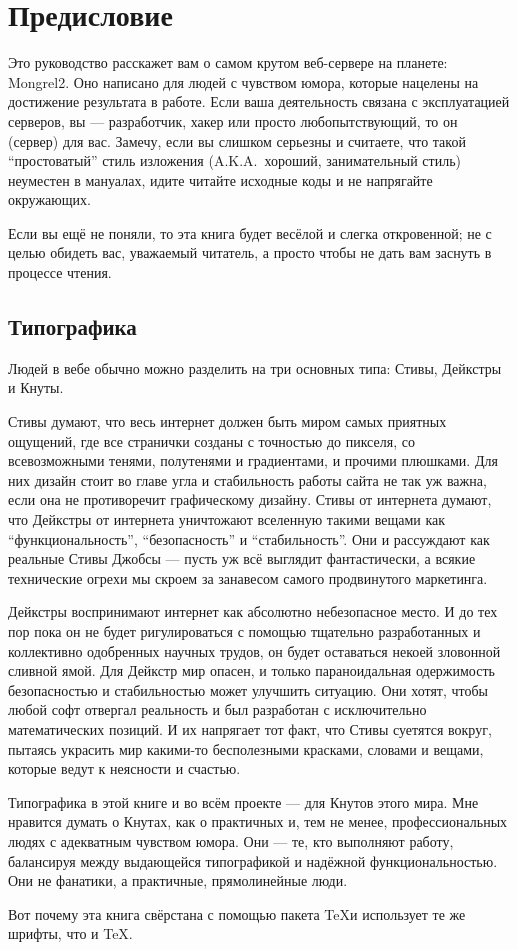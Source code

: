 \chapter{Предисловие}

Это руководство расскажет вам о самом крутом веб-сервере на планете: Mongrel2.
Оно написано для людей с чувством юмора, которые нацелены на достижение результата
в работе. Если ваша деятельность связана с эксплуатацией серверов, вы --- разработчик,
хакер или просто любопытствующий, то он (сервер) для вас. Замечу, если вы слишком серьезны
и считаете, что такой ``простоватый'' стиль изложения (A.K.A.\ хороший, занимательный стиль)
неуместен в мануалах, идите читайте исходные коды и не напрягайте окружающих.

Если вы ещё не поняли, то эта книга будет весёлой и слегка откровенной; не с целью обидеть
вас, уважаемый читатель, а просто чтобы не дать вам заснуть в процессе чтения.

\section*{Типографика}

Людей в вебе обычно можно разделить на три основных типа: Стивы, Дейкстры и Кнуты.

Стивы думают, что весь интернет должен быть миром самых приятных ощущений,
где все странички созданы с точностью до пикселя, со всевозможными тенями, полутенями
и градиентами, и прочими плюшками. Для них дизайн стоит во главе угла и стабильность
работы сайта не так уж важна, если она не противоречит графическому дизайну.
Стивы от интернета думают, что Дейкстры от интернета уничтожают вселенную такими
вещами как ``функциональность'', ``безопасность'' и ``стабильность''. Они и рассуждают
как реальные Стивы Джобсы --- пусть уж всё выглядит фантастически, а всякие технические
огрехи мы скроем за занавесом самого продвинутого маркетинга.

Дейкстры воспринимают интернет как абсолютно небезопасное место. И до тех пор пока
он не будет ригулироваться с помощью тщательно разработанных и коллективно одобренных
научных трудов, он будет оставаться некоей зловонной сливной ямой. Для Дейкстр мир опасен,
и только параноидальная одержимость безопасностью и стабильностью может улучшить
ситуацию. Они хотят, чтобы любой софт отвергал реальность и был разработан с
исключительно математических позиций. И их напрягает тот факт, что Стивы суетятся
вокруг, пытаясь украсить мир какими-то бесполезными красками, словами и вещами,
которые ведут к неясности и счастью.

Типографика в этой книге и во всём проекте --- для Кнутов этого мира. Мне нравится
думать о Кнутах, как о практичных и, тем не менее, профессиональных людях с адекватным
чувством юмора. Они --- те, кто выполняют работу, балансируя между выдающейся типографикой
и надёжной функциональностью. Они не фанатики, а практичные, прямолинейные люди.

Вот почему эта книга свёрстана с помощью пакета \TeX и использует те же шрифты, что и \TeX.
